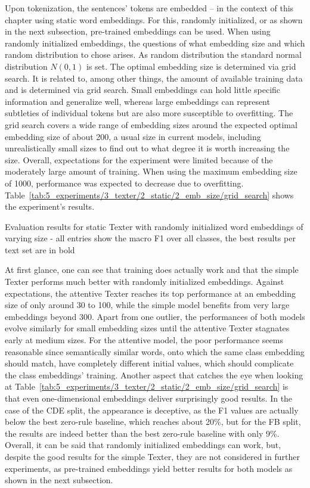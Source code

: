 Upon tokenization, the sentences' tokens are embedded -- in the context of this chapter using static word embeddings. For this, randomly initialized, or as shown in the next subsection, pre-trained embeddings can be used. When using randomly initialized embeddings, the questions of what embedding size and which random distribution to chose arises. As random distribution the standard normal distribution $N(0, 1)$ is set. The optimal embedding size is determined via grid search. It is related to, among other things, the amount of available training data and is determined via grid search. Small embeddings can hold little specific information and generalize well, whereas large embeddings can represent subtleties of individual tokens but are also more susceptible to overfitting. The grid search covers a wide range of embedding sizes around the expected optimal embedding size of about 200, a usual size in current models, including unrealistically small sizes to find out to what degree it is worth increasing the size. Overall, expectations for the experiment were limited because of the moderately large amount of training. When using the maximum embedding size of 1000, performance was expected to decrease due to overfitting. Table~\ref{tab:5_experiments/3_texter/2_static/2_emb_size/grid_search} shows the experiment's results.

\begin{table}[t]
    \centering
    
    \caption{Evaluation results for static Texter with randomly initialized word embeddings of varying size - all entries show the macro F1 over all classes, the best results per text set are in bold}
    \label{tab:5_experiments/3_texter/2_static/2_emb_size/grid_search}
\end{table}

At first glance, one can see that training does actually work and that the simple Texter performs much better with randomly initialized embeddings. Against expectations, the attentive Texter reaches its top performance at an embedding size of only around 30 to 100, while the simple model benefits from very large embeddings beyond 300. Apart from one outlier, the performances of both models evolve similarly for small embedding sizes until the attentive Texter stagnates early at medium sizes. For the attentive model, the poor performance seems reasonable since semantically similar words, onto which the same class embedding should match, have completely different initial values, which should complicate the class embeddings' training. Another aspect that catches the eye when looking at Table~\ref{tab:5_experiments/3_texter/2_static/2_emb_size/grid_search} is that even one-dimensional embeddings deliver surprisingly good results. In the case of the CDE split, the appearance is deceptive, as the F1 values are actually below the best zero-rule baseline, which reaches about 20\%, but for the FB split, the results are indeed better than the best zero-rule baseline with only 9\%. Overall, it can be said that randomly initialized embeddings can work, but, despite the good results for the simple Texter, they are not considered in further experiments, as pre-trained embeddings yield better results for both models as shown in the next subsection.
